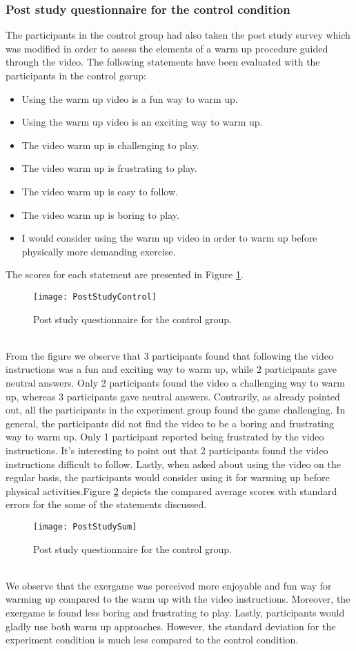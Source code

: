 \subsubsection{Post study questionnaire for the control condition} 
The participants in the control group had also taken the post study survey which was modified in order to assess the elements of a warm up procedure guided through the video. The following statements have been evaluated with the participants in the control gorup:
\begin{itemize}
\item Using the warm up video is a fun way to warm up.
\item Using the warm up video is an exciting way to warm up.
\item The video warm up is challenging to play.
\item The video warm up is frustrating to play.
\item The video warm up is easy to follow.
\item The video warm up is boring to play.
\item I would consider using the warm up video in order to warm up before physically more demanding exercise.
\end{itemize}
The scores for each statement are presented in Figure \ref{fig:poststudycontrol}.\\
\begin{figure}[h]
    \centering
    \texttt{[image: PostStudyControl]}
    \caption{Post study questionnaire for the control group.}
    \label{fig:poststudycontrol}
\end{figure}\\
From the figure we observe that 3 participants found that following the video instructions was a fun and exciting way to warm up, while 2 participants gave neutral answers. Only 2 participants found the video a challenging way to warm up, whereas 3 participants gave neutral answers. Contrarily, as already pointed out, all the participants in the experiment group found the game challenging. In general, the participants did not find the video to be a boring and frustrating way to warm up. Only 1 participant reported being frustrated by the video instructions. It's interesting to point out that 2 participants found the video instructions difficult to follow. Lastly, when asked about using the video on the regular basis, the participants would consider using it for warming up before physical activities.Figure \ref{fig:poststudysum} depicts the compared average scores with standard errors for the some of the statements discussed.
\begin{figure}[h]
    \centering
    \texttt{[image: PostStudySum]}
    \caption{Post study questionnaire for the control group.}
    \label{fig:poststudysum}
\end{figure}\\ We observe that the exergame was perceived more enjoyable and fun way for warming up compared to the warm up with the video instructions. Moreover, the exergame is found less boring and frustrating to play. Lastly, participants would gladly use both warm up approaches. However, the standard deviation for the experiment condition is much less compared to the control condition.

